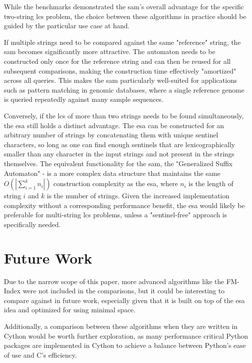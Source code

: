 While the benchmarks demonstrated the \acrshort{sam}'s overall advantage for the specific two-string \acrshort{lcs} problem, the choice between these algorithms in practice should be guided by the particular use case at hand.

If multiple strings need to be compared against the same "reference" string, the \acrshort{sam} becomes significantly more attractive.
The automaton needs to be constructed only once for the reference string and can then be reused for all subsequent comparisons, making the construction time effectively "amortized" across all queries.
This makes the \acrshort{sam} particularly well-suited for applications such as pattern matching in genomic databases, where a single reference genome is queried repeatedly against many sample sequences.

Conversely, if the \acrshort{lcs} of more than two strings needs to be found simultaneously, the \acrshort{esa} still holds a distinct advantage.
The \acrshort{esa} can be constructed for an arbitrary number of strings by concatenating them with unique \gls{sentinel} characters, 
so long as one can find enough sentinels that are lexicographically smaller than any character in the input strings and not present in the strings themselves.
The equivalent functionality for the \acrshort{sam}, the "Generalized Suffix Automaton"\cite{samdef} - 
is a more complex data structure that maintains the same $O(|\sum_{i=1}^k n_i|)$ construction complexity as the \acrshort{esa}, where $n_i$ is the length of string $i$ and $k$ is the number of strings.
Given the increased implementation complexity without a corresponding performance benefit, the \acrshort{esa} would likely be preferable for multi-string \acrshort{lcs} problems, unless a "sentinel-free" approach is specifically needed.

\section{Future Work}

Due to the narrow scope of this paper, more advanced algorithms like the FM-Index\cite{fmindex} were not included in the comparisons, 
but it could be interesting to compare against in future work, especially given that it is built on top of the \acrshort{esa} idea and optimized for using minimal space.

Additionally, a comparison between these algorithms when they are written in Cython\cite{cython} would be worth further exploration, 
as many performance critical Python packages are implemented in Cython to achieve a balance between Python's ease of use and C's efficiency.